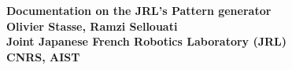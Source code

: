 \documentclass[11pt,a4paper,english,french,twoside]{book}
\begin{document}
\begin{titlepage}
\begin{center}
\vspace*{1cm}
\Huge
{}
{\bf \huge Documentation on the JRL's Pattern generator\\
}
\vspace*{0.5cm}
{\large \bf
Olivier Stasse, Ramzi Sellouati\\
\vspace*{0.5cm}
\normalsize{
Joint Japanese French Robotics Laboratory (JRL)\\
CNRS, AIST \\
}
}
\end{center}

\end{titlepage}

\setcounter{tocdepth}{3}
\tableofcontents





\end{document}

